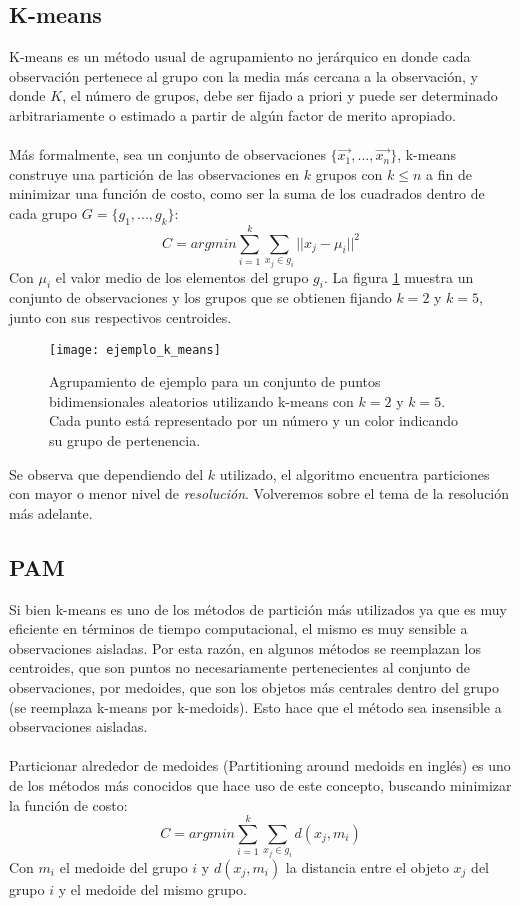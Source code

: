\subsection{K-means}
K-means es un método usual de agrupamiento no jerárquico en donde cada observación pertenece al grupo con la media más cercana a la observación, y donde $K$, el número de grupos, debe ser fijado a priori y puede ser determinado arbitrariamente o estimado a partir de algún factor de merito apropiado.\cite{Hartigan1979}\\\\
Más formalmente, sea un conjunto de observaciones $\{\vec{x_1},...,\vec{x_n}\}$, k-means construye una partición de las observaciones en $k$ grupos con $k \leq n$ a fin de minimizar una función de costo, como ser la suma de los cuadrados dentro de cada grupo $G = \{g_1,...,g_k\}$: 
\begin{equation}
	C = argmin\sum\limits_{i=1}^k \sum\limits_{x_j \in g_i}||x_j-\mu_i||^2
\end{equation}
Con $\mu_i$ el valor medio de los elementos del grupo $g_i$.
La figura \ref{fig:ejemplo_k_means} muestra un conjunto de observaciones y los grupos que se obtienen fijando $k=2$ y $k=5$, junto con sus respectivos centroides.
\begin{figure}[h]
    \centering
    \texttt{[image: ejemplo\_k\_means]}
    \caption{Agrupamiento de ejemplo para un conjunto de puntos bidimensionales aleatorios utilizando k-means con $k=2$ y $k=5$. Cada punto está representado por un número y un color indicando su grupo de pertenencia.}
    \label{fig:ejemplo_k_means}
\end{figure}
Se observa que dependiendo del $k$ utilizado, el algoritmo encuentra particiones con mayor o menor nivel de \textit{resolución}. Volveremos sobre el tema de la resolución más adelante.
\cite{Kogan2006}

\subsection{PAM}
Si bien k-means es uno de los métodos de partición más utilizados ya que es muy eficiente en términos de tiempo computacional, el mismo es muy sensible a observaciones aisladas. Por esta razón, en algunos métodos se reemplazan los centroides, que son puntos no necesariamente pertenecientes al conjunto de observaciones, por medoides, que son los objetos más centrales dentro del grupo (se reemplaza k-means por k-medoids). Esto hace que el método sea insensible a observaciones aisladas.\\\\
Particionar alrededor de medoides (Partitioning around medoids en inglés) es uno de los métodos más conocidos que hace uso de este concepto, buscando minimizar la función de costo:
\begin{equation}
	C = argmin\sum\limits_{i=1}^k \sum\limits_{x_j \in g_i} d(x_j, m_i)
\end{equation}
Con $m_i$ el medoide del grupo $i$ y $d(x_j, m_i)$ la distancia entre el objeto $x_j$ del grupo $i$ y el medoide del mismo grupo.
\cite{Park2009, Ibrahim2012}
